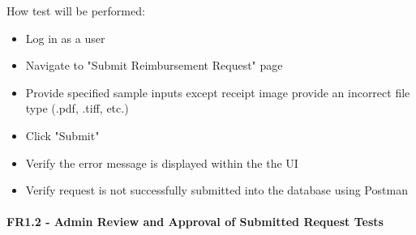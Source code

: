 \documentclass[12pt, titlepage]{article}
\begin{document}
\begin{enumerate}
How test will be performed: 
\begin{itemize}
    \item Log in as a user
    \item Navigate to "Submit Reimbursement Request" page
    \item Provide specified sample inputs except receipt image provide an incorrect file type (.pdf, .tiff, etc.)
    \item Click "Submit"
    \item Verify the error message is displayed within the the UI
    \item Verify request is not successfully submitted into the database using Postman
\end{itemize}

\end{enumerate}

\paragraph{FR1.2 - Admin Review and Approval of Submitted Request Tests}
\end{document}
